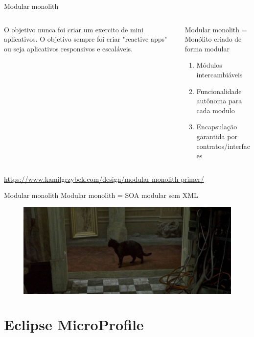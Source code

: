 \documentclass[aspectratio=169]{beamer}
\begin{document}
\begin{frame}{Modular monolith}

    \begin{columns}
        \begin{column}{0.5\textwidth}
    	   O objetivo nunca foi criar um exercito de mini aplicativos. O objetivo sempre foi criar "reactive apps" ou seja aplicativos responsivos e escaláveis.
    	\end{column}
    	\begin{column}{0.5\textwidth}  %
        Modular monolith = Monólito criado de forma modular
    		\begin{enumerate}
                \item Módulos intercambiáveis
                \item Funcionalidade autônoma para cada modulo
                \item Encapsulação garantida por contratos/interfaces
            \end{enumerate}

    	\end{column}
    \end{columns}
            \url{https://www.kamilgrzybek.com/design/modular-monolith-primer/}
\end{frame}


\begin{frame}{Modular monolith}
Modular monolith = SOA modular sem XML
\begin{figure}
	\centering
	\includegraphics[width=\linewidth]{Images/cat}
\end{figure}

\end{frame}

\section{Eclipse MicroProfile}
\end{document}
